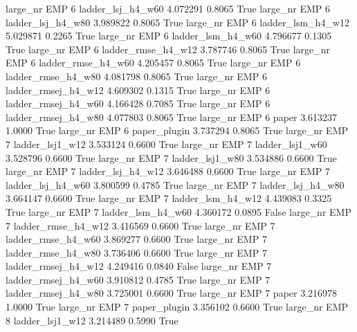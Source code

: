   large_nr      EMP                 6   ladder_lsj_h4_w60    4.072291      0.8065    True
  large_nr      EMP                 6   ladder_lsj_h4_w80    3.989822      0.8065    True
  large_nr      EMP                 6   ladder_lsm_h4_w12    5.029871      0.2265    True
  large_nr      EMP                 6   ladder_lsm_h4_w60    4.796677      0.1305    True
  large_nr      EMP                 6  ladder_rmse_h4_w12    3.787746      0.8065    True
  large_nr      EMP                 6  ladder_rmse_h4_w60    4.205457      0.8065    True
  large_nr      EMP                 6  ladder_rmse_h4_w80    4.081798      0.8065    True
  large_nr      EMP                 6 ladder_rmsej_h4_w12    4.609302      0.1315    True
  large_nr      EMP                 6 ladder_rmsej_h4_w60    4.166428      0.7085    True
  large_nr      EMP                 6 ladder_rmsej_h4_w80    4.077803      0.8065    True
  large_nr      EMP                 6               paper    3.613237      1.0000    True
  large_nr      EMP                 6        paper_plugin    3.737294      0.8065    True
  large_nr      EMP                 7     ladder_lsj1_w12    3.533124      0.6600    True
  large_nr      EMP                 7     ladder_lsj1_w60    3.528796      0.6600    True
  large_nr      EMP                 7     ladder_lsj1_w80    3.534886      0.6600    True
  large_nr      EMP                 7   ladder_lsj_h4_w12    3.646488      0.6600    True
  large_nr      EMP                 7   ladder_lsj_h4_w60    3.800599      0.4785    True
  large_nr      EMP                 7   ladder_lsj_h4_w80    3.664147      0.6600    True
  large_nr      EMP                 7   ladder_lsm_h4_w12    4.439083      0.3325    True
  large_nr      EMP                 7   ladder_lsm_h4_w60    4.360172      0.0895   False
  large_nr      EMP                 7  ladder_rmse_h4_w12    3.416569      0.6600    True
  large_nr      EMP                 7  ladder_rmse_h4_w60    3.869277      0.6600    True
  large_nr      EMP                 7  ladder_rmse_h4_w80    3.736406      0.6600    True
  large_nr      EMP                 7 ladder_rmsej_h4_w12    4.249416      0.0840   False
  large_nr      EMP                 7 ladder_rmsej_h4_w60    3.910812      0.4785    True
  large_nr      EMP                 7 ladder_rmsej_h4_w80    3.725001      0.6600    True
  large_nr      EMP                 7               paper    3.216978      1.0000    True
  large_nr      EMP                 7        paper_plugin    3.356102      0.6600    True
  large_nr      EMP                 8     ladder_lsj1_w12    3.214489      0.5990    True
